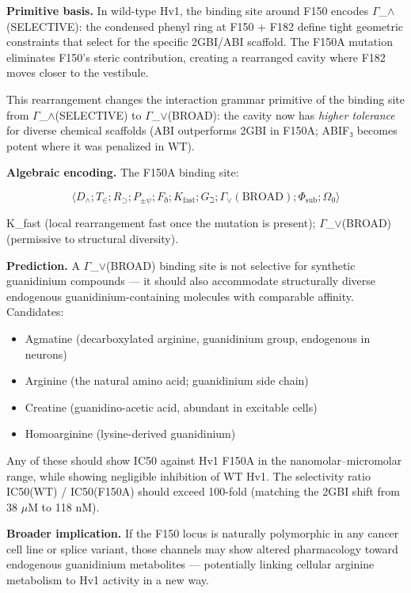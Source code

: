 \documentclass[12pt,a4paper]{article}
\begin{document}
\textbf{Primitive basis.} In wild-type Hv1, the binding site around F150 encodes $\Gamma$\_$\land$(SELECTIVE): the condensed phenyl ring at F150 + F182 define tight geometric constraints that select for the specific 2GBI/ABI scaffold. The F150A mutation eliminates F150's steric contribution, creating a rearranged cavity where F182 moves closer to the vestibule.

This rearrangement changes the interaction grammar primitive of the binding site from $\Gamma$\_$\land$(SELECTIVE) to $\Gamma$\_$\lor$(BROAD): the cavity now has \emph{higher tolerance} for diverse chemical scaffolds (ABI outperforms 2GBI in F150A; ABIF₃ becomes potent where it was penalized in WT).

\textbf{Algebraic encoding.} The F150A binding site:

\[\langle D_\wedge; T_\in; R_\supset; P_{\pm\psi}; F_\eth; K_\text{fast}; G_\beth; \Gamma_\vee(\text{BROAD}); \Phi_\text{sub}; \Omega_0 \rangle\]

K\_fast (local rearrangement fast once the mutation is present); $\Gamma$\_$\lor$(BROAD) (permissive to structural diversity).

\textbf{Prediction.} A $\Gamma$\_$\lor$(BROAD) binding site is not selective for synthetic guanidinium compounds --- it should also accommodate structurally diverse endogenous guanidinium-containing molecules with comparable affinity. Candidates:

\begin{itemize}
    \item Agmatine (decarboxylated arginine, guanidinium group, endogenous in neurons)
    \item Arginine (the natural amino acid; guanidinium side chain)
    \item Creatine (guanidino-acetic acid, abundant in excitable cells)
    \item Homoarginine (lysine-derived guanidinium)
\end{itemize}

Any of these should show IC50 against Hv1 F150A in the nanomolar--micromolar range, while showing negligible inhibition of WT Hv1. The selectivity ratio IC50(WT) / IC50(F150A) should exceed 100-fold (matching the 2GBI shift from 38 $\mu$M to 118 nM).

\textbf{Broader implication.} If the F150 locus is naturally polymorphic in any cancer cell line or splice variant, those channels may show altered pharmacology toward endogenous guanidinium metabolites --- potentially linking cellular arginine metabolism to Hv1 activity in a new way.
\end{document}

